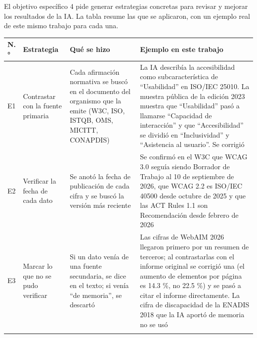 \documentclass[10pt,letterpaper,onecolumn]{IEEEtran}
\newcommand{\filafina}{\arrayrulecolor{black!30}\specialrule{0.3pt}{1.5pt}{1.5pt}\arrayrulecolor{black}}
\begin{document}
El objetivo específico 4 pide generar estrategias concretas para revisar y mejorar los resultados de la IA. La tabla resume las que se aplicaron, con un ejemplo real de este mismo trabajo para cada una.

\begin{longtable}[]{@{}
  >{\raggedright\arraybackslash}p{0.0959\dimexpr\linewidth-6\tabcolsep\relax}
  >{\raggedright\arraybackslash}p{0.1781\dimexpr\linewidth-6\tabcolsep\relax}
  >{\raggedright\arraybackslash}p{0.2466\dimexpr\linewidth-6\tabcolsep\relax}
  >{\raggedright\arraybackslash}p{0.4795\dimexpr\linewidth-6\tabcolsep\relax}@{}}
\toprule\noalign{}
\begin{minipage}[b]{\linewidth}\raggedright
N.°
\end{minipage} & \begin{minipage}[b]{\linewidth}\raggedright
Estrategia
\end{minipage} & \begin{minipage}[b]{\linewidth}\raggedright
Qué se hizo
\end{minipage} & \begin{minipage}[b]{\linewidth}\raggedright
Ejemplo en este trabajo
\end{minipage} \\
\midrule\noalign{}
\endhead
\bottomrule\noalign{}
\endlastfoot
E1 & Contrastar con la fuente primaria & Cada afirmación normativa se buscó en el documento del organismo que la emite (W3C, ISO, ISTQB, OMS, MICITT, CONAPDIS) & La IA describía la accesibilidad como subcaracterística de ``Usabilidad'' en ISO/IEC 25010. La muestra pública de la edición 2023 muestra que ``Usabilidad'' pasó a llamarse ``Capacidad de interacción'' y que ``Accesibilidad'' se dividió en ``Inclusividad'' y ``Asistencia al usuario''. Se corrigió \\ \filafina
E2 & Verificar la fecha de cada dato & Se anotó la fecha de publicación de cada cifra y se buscó la versión más reciente & Se confirmó en el W3C que WCAG 3.0 seguía siendo Borrador de Trabajo al 10 de septiembre de 2026, que WCAG 2.2 es ISO/IEC 40500 desde octubre de 2025 y que las ACT Rules 1.1 son Recomendación desde febrero de 2026 \\ \filafina
E3 & Marcar lo que no se pudo verificar & Si un dato venía de una fuente secundaria, se dice en el texto; si venía ``de memoria'', se descartó & Las cifras de WebAIM 2026 llegaron primero por un resumen de terceros; al contrastarlas con el informe original se corrigió una (el aumento de elementos por página es 14.3 \%, no 22.5 \%) y se pasó a citar el informe directamente. La cifra de discapacidad de la ENADIS 2018 que la IA aportó de memoria no se usó \\ \filafina

\end{longtable}
\end{document}
